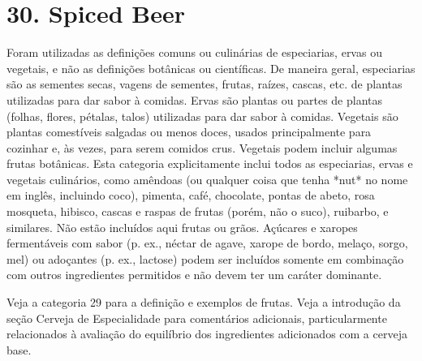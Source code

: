 \section*{30. Spiced Beer}

Foram utilizadas as definições comuns ou culinárias de especiarias, ervas ou vegetais, e não as definições botânicas ou científicas. De maneira geral, especiarias são as sementes secas, vagens de sementes, frutas, raízes, cascas, etc. de plantas utilizadas para dar sabor à comidas. Ervas são plantas ou partes de plantas (folhas, flores, pétalas, talos) utilizadas para dar sabor à comidas. Vegetais são plantas comestíveis salgadas ou menos doces, usados principalmente para cozinhar e, às vezes, para serem comidos crus. Vegetais podem incluir algumas frutas botânicas. Esta categoria explicitamente inclui todos as especiarias, ervas e vegetais culinários, como amêndoas (ou qualquer coisa que tenha *nut* no nome em inglês, incluindo coco), pimenta, café, chocolate, pontas de abeto, rosa mosqueta, hibisco, cascas e raspas de frutas (porém, não o suco), ruibarbo, e similares. Não estão incluídos aqui frutas ou grãos. Açúcares e xaropes fermentáveis com sabor (p. ex., néctar de agave, xarope de bordo, melaço, sorgo, mel) ou adoçantes (p. ex., lactose) podem ser incluídos somente em combinação com outros ingredientes permitidos e não devem ter um caráter dominante.

Veja a categoria 29 para a definição e exemplos de frutas. Veja a introdução da seção Cerveja de Especialidade para comentários adicionais, particularmente relacionados à avaliação do equilíbrio dos ingredientes adicionados com a cerveja base.
